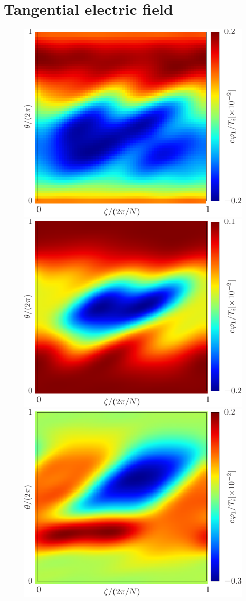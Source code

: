 
\section{Tangential electric field}\label{SEC_EUTERPE}


\begin{figure}
\begin{center}
\includegraphics[width=0.3\columnwidth,angle=0]{figures/euterpeAIII02}
\includegraphics[width=0.3\columnwidth,angle=0]{figures/knososeutAIII02}
\includegraphics[width=0.3\columnwidth,angle=0]{figures/knososAIII02}

\


\end{center}
\end{figure}
